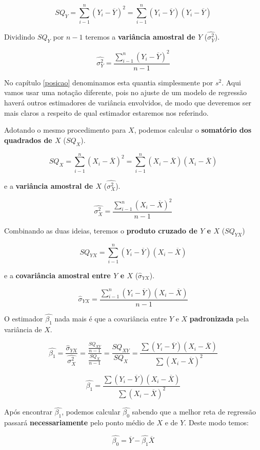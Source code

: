 \documentclass[
]{book}
\begin{document}
\[SQ_Y = \sum_{i-1}^{n} (Y_i - \overline{Y})^2 = \sum_{i-1}^{n}(Y_i - \overline{Y}) (Y_i - \overline{Y})\]

Dividindo \(SQ_Y\) por \(n-1\) teremos a \textbf{variância amostral de \(Y\)} (\(\hat{\sigma^2_Y}\)).

\[\hat{\sigma^2_Y} = \frac{\sum_{i-1}^{n} (Y_i - \overline{Y})^2}{n-1}\]

No capítulo \ref{posicao} denominamos esta quantia simplesmente por \(s^2\). Aqui vamos usar uma notação diferente, pois no ajuste de um modelo de regressão haverá outros estimadores de variância envolvidos, de modo que deveremos ser mais claros a respeito de qual estimador estaremos nos referindo.

Adotando o mesmo procedimento para \(X\), podemos calcular o \textbf{somatório dos quadrados de \(X\)} (\(SQ_X\)).

\[SQ_X = \sum_{i-1}^{n} (X_i - \overline{X})^2 = \sum_{i-1}^{n}(X_i - \overline{X}) (X_i - \overline{X})\]

e a \textbf{variância amostral de \(X\)} (\(\hat{\sigma^2_X}\)).

\[\hat{\sigma^2_X} = \frac{\sum_{i-1}^{n} (X_i - \overline{X})^2}{n-1}\]

Combinando as duas ideias, teremos o \textbf{produto cruzado de \(Y\) e \(X\)} (\(SQ_{YX}\))

\[SQ_{YX} = \sum_{i-1}^{n}(Y_i - \overline{Y}) (X_i - \overline{X})\]

e a \textbf{covariância amostral entre \(Y\) e \(X\)} (\(\hat{\sigma}_{YX}\)).

\[\hat{\sigma}_{YX} = \frac{\sum_{i-1}^{n}(Y_i - \overline{Y}) (X_i - \overline{X})}{n-1}\]

O estimador \(\hat{\beta_1}\) nada mais é que a covariância entre \(Y\) e \(X\) \textbf{padronizada} pela variância de \(X\).

\[\hat{\beta_1} = \frac{\hat{\sigma}_{YX}}{\hat{\sigma^2_X}} = \frac{\frac{SQ_{XY}}{n-1}}{\frac{SQ_X}{n-1}} = \frac{SQ_{XY}}{SQ_X} = \frac{\sum{(Y_i - \overline{Y})(X_i - \overline{X})}}{\sum{(X_i - \overline{X})^2}}\]

\[\hat{\beta_1} = \frac{\sum{(Y_i - \overline{Y})(X_i - \overline{X})}}{\sum{(X_i - \overline{X})^2}}\]

Após encontrar \(\hat{\beta_1}\), podemos calcular \(\hat{\beta_0}\) sabendo que a melhor reta de regressão passará \textbf{necessariamente} pelo ponto médio de \(X\) e de \(Y\). Deste modo temos:

\[\hat{\beta_0} = \overline{Y} - \hat{\beta_1}\overline{X}\]
\end{document}

